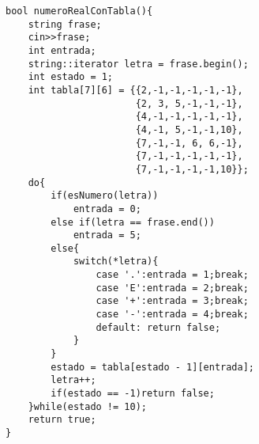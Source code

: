 \documentclass[a4paper,12pt]{article}
\begin{document}
\begin{lstlisting}
bool numeroRealConTabla(){
    string frase;
    cin>>frase;
    int entrada;
    string::iterator letra = frase.begin();
    int estado = 1;
    int tabla[7][6] = {{2,-1,-1,-1,-1,-1},
                       {2, 3, 5,-1,-1,-1},
                       {4,-1,-1,-1,-1,-1},
                       {4,-1, 5,-1,-1,10},
                       {7,-1,-1, 6, 6,-1},
                       {7,-1,-1,-1,-1,-1},
                       {7,-1,-1,-1,-1,10}};
    do{
        if(esNumero(letra))
            entrada = 0;
        else if(letra == frase.end())
            entrada = 5;
        else{
            switch(*letra){
                case '.':entrada = 1;break;
                case 'E':entrada = 2;break;
                case '+':entrada = 3;break;
                case '-':entrada = 4;break;
                default: return false;
            }
        }
        estado = tabla[estado - 1][entrada];
        letra++;
        if(estado == -1)return false;
    }while(estado != 10);
    return true;
}

\end{lstlisting}
\end{document}
